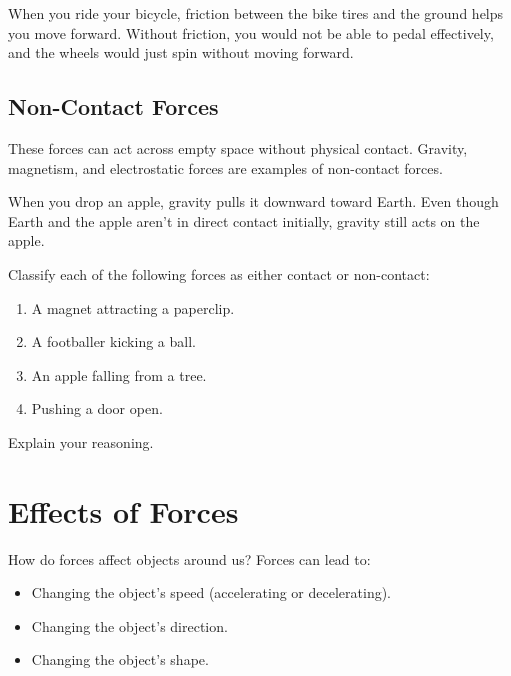 
\begin{example}
When you ride your bicycle, friction between the bike tires and the ground helps you move forward. Without friction, you would not be able to pedal effectively, and the wheels would just spin without moving forward.
\end{example}

\subsection{Non-Contact Forces}

These forces can act across empty space without physical contact. Gravity, magnetism, and electrostatic forces are examples of non-contact forces.


\begin{example}
When you drop an apple, gravity pulls it downward toward Earth. Even though Earth and the apple aren't in direct contact initially, gravity still acts on the apple.
\end{example}

\begin{stopandthink}
Classify each of the following forces as either contact or non-contact:
\begin{enumerate}
    \item A magnet attracting a paperclip.
    \item A footballer kicking a ball.
    \item An apple falling from a tree.
    \item Pushing a door open.
\end{enumerate}
Explain your reasoning.
\end{stopandthink}

\section{Effects of Forces}

How do forces affect objects around us? Forces can lead to:

\begin{itemize}
    \item Changing the object's speed (accelerating or decelerating).
    \item Changing the object's direction.
    \item Changing the object's shape.
\end{itemize}

